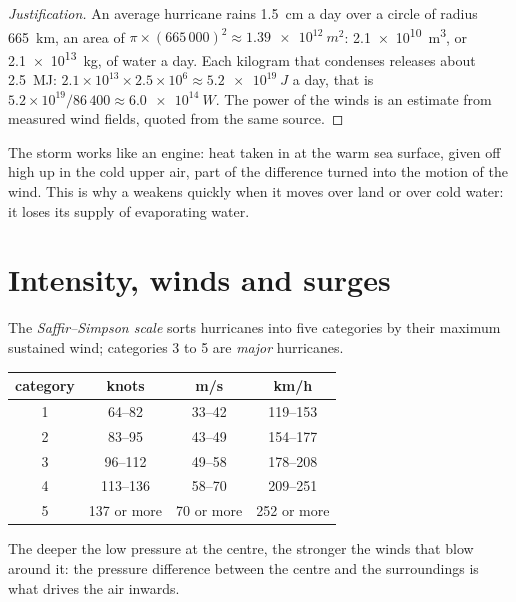 \begin{proof}[Justification]
An average hurricane rains \qty{1.5}{cm} a day over a circle of radius
\qty{665}{km}, an area of $\pi \times (665\,000)^2 \approx
\qty{1.39e12}{m^2}$: \qty{2.1e10}{m^3}, or \qty{2.1e13}{kg}, of water a day.
Each kilogram that condenses releases about \qty{2.5}{MJ}: $2.1\times10^{13}
\times 2.5\times10^6 \approx \qty{5.2e19}{J}$ a day, that is
$5.2\times10^{19}/86\,400 \approx \qty{6.0e14}{W}$. The power of the winds
is an estimate from measured wind fields, quoted from the same source.
\end{proof}

The storm works like an engine: heat taken in at the warm sea surface, given
off high up in the cold upper air, part of the difference turned into the
motion of the wind. This is why a  weakens quickly when it
moves over land or over cold water: it loses its supply of evaporating
water.

\section{Intensity, winds and surges}

\begin{definition}\label{def:g10:storms-and-cyclones:scale}
The \emph{Saffir--Simpson scale} sorts
hurricanes into five categories by their maximum sustained wind; categories
3 to 5 are \emph{major} hurricanes.
\end{definition}

\begin{center}
\small
\begin{tabular}{cccc}
\hline
category & knots & \unit{m/s} & \unit{km/h} \\
\hline
1 & 64--82 & 33--42 & 119--153 \\
2 & 83--95 & 43--49 & 154--177 \\
3 & 96--112 & 49--58 & 178--208 \\
4 & 113--136 & 58--70 & 209--251 \\
5 & 137 or more & 70 or more & 252 or more \\
\hline
\end{tabular}
\end{center}

The deeper the low pressure at the centre, the stronger the winds that blow
around it: the pressure difference between the centre and the surroundings
is what drives the air inwards.

